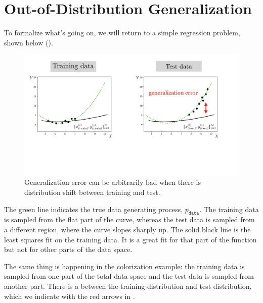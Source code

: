 \section{Out-of-Distribution Generalization}

To formalize what's going on, we will return to a simple regression problem, shown below (\fig{\ref{fig:bias_and_shift:regression_example}}).
\begin{figure}[h!]
    \centerline{
    \includegraphics[width=1.0\linewidth]{./figures/bias_and_shift/regression_example.pdf}
    }
    \caption{Generalization error can be arbitrarily bad when there is distribution shift between training and test.}
    \label{fig:bias_and_shift:regression_example}
\end{figure}

The green line indicates the true data generating process, $p_{\texttt{data}}$. The training data is sampled from the flat part of the curve, whereas the test data is sampled from a different region, where the curve slopes sharply up. The solid black line is the least squares fit on the training data. It is a great fit for that part of the function but not for other parts of the data space.

The same thing is happening in the colorization example: the training data is sampled from one part of the total data space and the test data is sampled from another part. There is a  between the training distribution and test distribution, which we indicate with the red arrows in \fig{\ref{fig:bias_and_shift:colorization_domain_gap}}.


